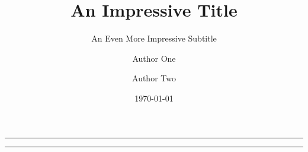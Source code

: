 \title{An Impressive Title}
\subtitle{An Even More Impressive Subtitle}

\author[1]{Author One}
\author[2]{Author Two}


\newcommand{\compactAuthor}{My Group of Authors}

\date{\today}

\onecolumn
\maketitle

\vfill
\hrule

\begin{abstract}
    \noindent
    \lipsum[1]
\end{abstract}

\hrule
\vfill

\twocolumn
